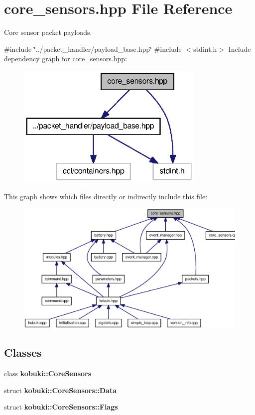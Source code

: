 \section{core\-\_\-sensors.\-hpp \-File \-Reference}
\label{core__sensors_8hpp}


\-Core sensor packet payloads.  


{\ttfamily \#include \char`\"{}../packet\-\_\-handler/payload\-\_\-base.\-hpp\char`\"{}}\*
{\ttfamily \#include $<$stdint.\-h$>$}\*
\-Include dependency graph for core\-\_\-sensors.\-hpp\-:
\nopagebreak
\begin{figure}[H]
\begin{center}
\leavevmode
\includegraphics[width=256pt]{core__sensors_8hpp__incl}
\end{center}
\end{figure}
\-This graph shows which files directly or indirectly include this file\-:
\nopagebreak
\begin{figure}[H]
\begin{center}
\leavevmode
\includegraphics[width=350pt]{core__sensors_8hpp__dep__incl}
\end{center}
\end{figure}
\subsection*{\-Classes}
\begin{DoxyCompactItemize}
\item 
class {\bf kobuki\-::\-Core\-Sensors}
\item 
struct {\bf kobuki\-::\-Core\-Sensors\-::\-Data}
\item 
struct {\bf kobuki\-::\-Core\-Sensors\-::\-Flags}
\end{DoxyCompactItemize}
